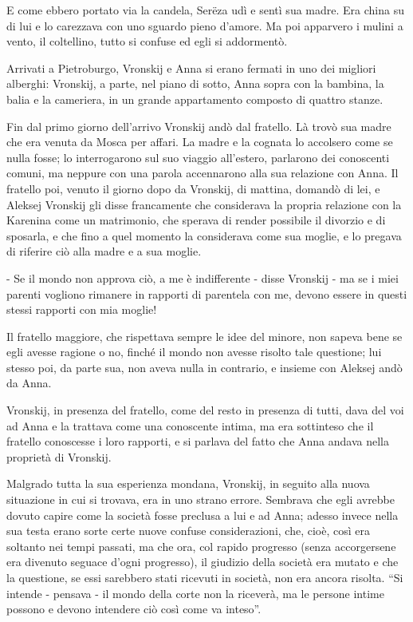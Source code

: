 E come ebbero portato via la candela, Serëza udì e sentì sua madre. Era china su di lui e lo carezzava con uno sguardo pieno d'amore. Ma poi apparvero i mulini a vento, il coltellino, tutto si confuse ed egli si addormentò. 

Arrivati a Pietroburgo, Vronskij e Anna si erano fermati in uno dei migliori alberghi: Vronskij, a parte, nel piano di sotto, Anna sopra con la bambina, la balia e la cameriera, in un grande appartamento composto di quattro stanze. 

Fin dal primo giorno dell'arrivo Vronskij andò dal fratello. Là trovò sua madre che era venuta da Mosca per affari. La madre e la cognata lo accolsero come se nulla fosse; lo interrogarono sul suo viaggio all'estero, parlarono dei conoscenti comuni, ma neppure con una parola accennarono alla sua relazione con Anna. Il fratello poi, venuto il giorno dopo da Vronskij, di mattina, domandò di lei, e Aleksej Vronskij gli disse francamente che considerava la propria relazione con la Karenina come un matrimonio, che sperava di render possibile il divorzio e di sposarla, e che fino a quel momento la considerava come sua moglie, e lo pregava di riferire ciò alla madre e a sua moglie. 

- Se il mondo non approva ciò, a me è indifferente - disse Vronskij - ma se i miei parenti vogliono rimanere in rapporti di parentela con me, devono essere in questi stessi rapporti con mia moglie! 

Il fratello maggiore, che rispettava sempre le idee del minore, non sapeva bene se egli avesse ragione o no, finché il mondo non avesse risolto tale questione; lui stesso poi, da parte sua, non aveva nulla in contrario, e insieme con Aleksej andò da Anna. 

Vronskij, in presenza del fratello, come del resto in presenza di tutti, dava del voi ad Anna e la trattava come una conoscente intima, ma era sottinteso che il fratello conoscesse i loro rapporti, e si parlava del fatto che Anna andava nella proprietà di Vronskij. 

Malgrado tutta la sua esperienza mondana, Vronskij, in seguito alla nuova situazione in cui si trovava, era in uno strano errore. Sembrava che egli avrebbe dovuto capire come la società fosse preclusa a lui e ad Anna; adesso invece nella sua testa erano sorte certe nuove confuse considerazioni, che, cioè, così era soltanto nei tempi passati, ma che ora, col rapido progresso (senza accorgersene era divenuto seguace d'ogni progresso), il giudizio della società era mutato e che la questione, se essi sarebbero stati ricevuti in società, non era ancora risolta. ``Si intende - pensava - il mondo della corte non la riceverà, ma le persone intime possono e devono intendere ciò così come va inteso''. 

